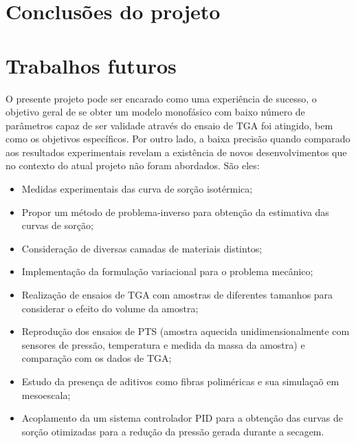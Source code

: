 \section{Conclusões do projeto}


\section{Trabalhos futuros}
O presente projeto pode ser encarado como uma experiência de sucesso, o objetivo
geral de se obter um modelo monofásico com baixo número de parâmetros capaz de
ser validade através do ensaio de TGA foi atingido, bem como os objetivos
específicos. Por outro lado, a baixa precisão quando comparado aos resultados
experimentais revelam a existência de novos desenvolvimentos que no contexto do
atual projeto não foram abordados. São eles:

\begin{itemize}
    \item Medidas experimentais das curva de sorção isotérmica;
    \item Propor um método de problema-inverso para obtenção da estimativa das
      curvas de sorção;
    \item Consideração de diversas camadas de materiais distintos;
    \item Implementação da formulação variacional para o problema mecânico;
    \item Realização de ensaios de TGA com amostras de diferentes tamanhos para
      considerar o efeito do volume da amostra;
    \item Reprodução dos ensaios de PTS (amostra aquecida unidimensionalmente com
      sensores de pressão, temperatura e medida da massa da amostra) e
      comparação com os dados de TGA;
    \item Estudo da presença de aditivos como fibras poliméricas e sua simulaçaõ
      em mesoescala;
    \item Acoplamento da um sistema controlador PID para a obtenção das curvas
      de sorção otimizadas para a redução da pressão gerada durante a secagem.
\end{itemize}